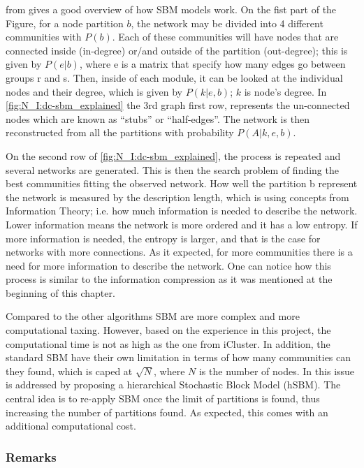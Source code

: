  from \citet{Peixoto2021-jx} gives a good overview of how SBM models work. On the fist part of the Figure, for a node partition $b$, the network may be divided into 4 different communities with $P(b)$. Each of these communities will have nodes that are connected inside (in-degree) or/and outside of the partition (out-degree); this is given by $P(e|b)$, where e is a matrix that specify how many edges go between groups r and s. Then, inside of each module, it can be looked at the individual nodes and their degree, which is given by $ P(k|e,b)$; $k$ is node's degree. In \cref{fig:N_I:dc-sbm_explained} the 3rd graph first row, represents the un-connected nodes which are known as “stubs” or “half-edges”. The network is then reconstructed from all the partitions with probability $P(A|k,e,b)$. 

On the second row of \cref{fig:N_I:dc-sbm_explained}, the process is repeated and several networks are generated. This is then the search problem of finding the best communities fitting the observed network. How well the partition b represent the network is measured by the description length, which is using concepts from Information Theory; i.e. how much information is needed to describe the network. Lower information means the network is more ordered and it has a low entropy. If more information is needed, the entropy is larger, and that is the case for networks with more connections. As it expected, for more communities there is a need for more information to describe the network. One can notice how this process is similar to the information compression as it was mentioned at the beginning of this chapter.

Compared to the other algorithms SBM are more complex and more computational taxing. However, based on the experience in this project, the computational time is not as high as the one from iCluster\citet{Mo2013-zi}. In addition, the standard SBM \citet{Peixoto2019-fg, Peixoto2017-gc, Peixoto2017-ua, Karrer2011-si} have their own limitation in terms of how many communities can they found, which is caped at $\sqrt{N}$, where $N$ is the number of nodes. In \citet{Peixoto2014-yb} this issue is addressed by proposing a hierarchical Stochastic Block Model (hSBM). The central idea is to re-apply SBM once the limit of partitions is found, thus increasing the number of partitions found. As expected, this comes with an additional computational cost.

\subsubsection{Remarks}


